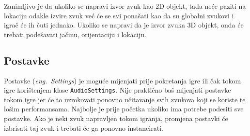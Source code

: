Zanimljivo je da ukoliko se napravi izvor zvuk kao 2D objekt, tada neće paziti na lokaciju odakle izvire zvuk već će se svi ponašati kao da su globalni zvukovi i igrač će ih čuti jednako. Ukoliko se napravi da je izvor zvuka 3D objekt, onda će trebati podešavati jačinu, orijentaciju i lokaciju.

\subsection{Postavke}
Postavke (\emph{eng.~Settings}) je moguće mijenjati prije pokretanja igre ili čak tokom igre korištenjem klase \texttt{AudioSettings}. Nije praktično baš mijenjati postavke tokom igre jer će to uzrokovati ponovno učitavanje svih zvukova koji se koriste te lošim performansama. Najbolje je prije početka ukoliko ima potrebe podesiti sve postavke. Ako je neki zvuk napravljen tokom igranja, promjena postavki će izbrisati taj zvuk i trebati će ga ponovno instancirati.